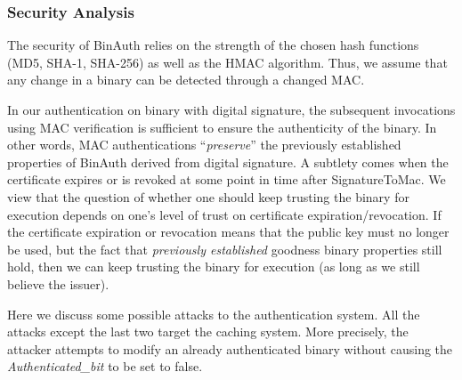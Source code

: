 \subsubsection{Security Analysis}
\label{sec:binauth-analysis}

The security of BinAuth relies on the strength
of the chosen hash functions (MD5, SHA-1, SHA-256) as well as
the HMAC algorithm.
Thus, we assume that any change in a binary can be detected through a changed MAC.

In our authentication on binary with digital signature, 
the subsequent invocations using MAC verification is sufficient 
to ensure the authenticity of the binary.
In other words, MAC authentications ``{\em preserve}'' the previously
established properties of BinAuth derived from digital signature.
A subtlety comes when the certificate expires or is revoked 
at some point in time after SignatureToMac.
We view that the question of whether one should keep trusting the binary for execution
depends on one's level of trust on certificate expiration/revocation.
If the certificate expiration or revocation means 
that the public key must no longer be used,
but the fact that {\em previously established} goodness binary properties still hold,
then we can keep trusting the binary for execution (as long as we still believe the issuer).


Here we discuss some possible attacks to the authentication system.
All the attacks except the last two target the caching system.
More precisely, the attacker attempts to modify an already authenticated
binary without causing the {\it Authenticated\_bit} to be set to false.

